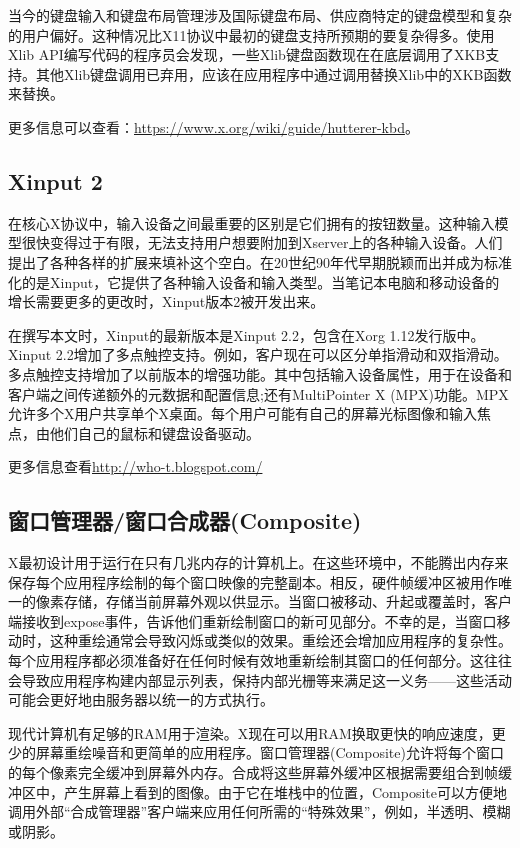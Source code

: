 当今的键盘输入和键盘布局管理涉及国际键盘布局、供应商特定的键盘模型和复杂的用户偏好。这种情况比X11协议中最初的键盘支持所预期的要复杂得多。使用Xlib API编写代码的程序员会发现，一些Xlib键盘函数现在在底层调用了XKB支持。其他Xlib键盘调用已弃用，应该在应用程序中通过调用替换Xlib中的XKB函数来替换。

\noindent 更多信息可以查看：\href{https://www.x.org/wiki/guide/hutterer-kbd}{https://www.x.org/wiki/guide/hutterer-kbd}。

\subsection{Xinput 2}

在核心X协议中，输入设备之间最重要的区别是它们拥有的按钮数量。这种输入模型很快变得过于有限，无法支持用户想要附加到Xserver上的各种输入设备。人们提出了各种各样的扩展来填补这个空白。在20世纪90年代早期脱颖而出并成为标准化的是Xinput，它提供了各种输入设备和输入类型。当笔记本电脑和移动设备的增长需要更多的更改时，Xinput版本2被开发出来。

在撰写本文时，Xinput的最新版本是Xinput 2.2，包含在Xorg 1.12发行版中。Xinput 2.2增加了多点触控支持。例如，客户现在可以区分单指滑动和双指滑动。多点触控支持增加了以前版本的增强功能。其中包括输入设备属性，用于在设备和客户端之间传递额外的元数据和配置信息;还有MultiPointer X (MPX)功能。MPX允许多个X用户共享单个X桌面。每个用户可能有自己的屏幕光标图像和输入焦点，由他们自己的鼠标和键盘设备驱动。

\noindent 更多信息查看\href{http://who-t.blogspot.com/}{http://who-t.blogspot.com/}

\subsection{窗口管理器/窗口合成器(Composite)}

X最初设计用于运行在只有几兆内存的计算机上。在这些环境中，不能腾出内存来保存每个应用程序绘制的每个窗口映像的完整副本。相反，硬件帧缓冲区被用作唯一的像素存储，存储当前屏幕外观以供显示。当窗口被移动、升起或覆盖时，客户端接收到expose事件，告诉他们重新绘制窗口的新可见部分。不幸的是，当窗口移动时，这种重绘通常会导致闪烁或类似的效果。重绘还会增加应用程序的复杂性。每个应用程序都必须准备好在任何时候有效地重新绘制其窗口的任何部分。这往往会导致应用程序构建内部显示列表，保持内部光栅等来满足这一义务——这些活动可能会更好地由服务器以统一的方式执行。

现代计算机有足够的RAM用于渲染。X现在可以用RAM换取更快的响应速度，更少的屏幕重绘噪音和更简单的应用程序。窗口管理器(Composite)允许将每个窗口的每个像素完全缓冲到屏幕外内存。合成将这些屏幕外缓冲区根据需要组合到帧缓冲区中，产生屏幕上看到的图像。由于它在堆栈中的位置，Composite可以方便地调用外部“合成管理器”客户端来应用任何所需的“特殊效果”，例如，半透明、模糊或阴影。

